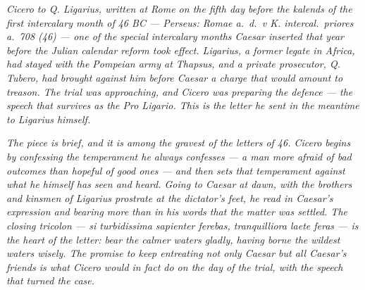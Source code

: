 
\textit{Cicero to Q. Ligarius, written at Rome on the fifth day
before the kalends of the first intercalary month of 46 BC ---
Perseus: \textit{Romae a.~d.~v K. intercal.~priores a.~708 (46)}
--- one of the special intercalary months Caesar inserted that
year before the Julian calendar reform took effect. Ligarius, a
former legate in Africa, had stayed with the Pompeian army at
Thapsus, and a private prosecutor, Q. Tubero, had brought against
him before Caesar a charge that would amount to treason. The
trial was approaching, and Cicero was preparing the defence ---
the speech that survives as the \textit{Pro Ligario}. This is the
letter he sent in the meantime to Ligarius himself.}

\textit{The piece is brief, and it is among the gravest of the
letters of 46. Cicero begins by confessing the temperament he
always confesses --- a man more afraid of bad outcomes than
hopeful of good ones --- and then sets that temperament against
what he himself has seen and heard. Going to Caesar at dawn, with
the brothers and kinsmen of Ligarius prostrate at the dictator's
feet, he read in Caesar's expression and bearing more than in his
words that the matter was settled. The closing tricolon ---
\textit{si turbidissima sapienter ferebas, tranquilliora laete
feras} --- is the heart of the letter: bear the calmer waters
gladly, having borne the wildest waters wisely. The promise to
keep entreating not only Caesar but all Caesar's friends is what
Cicero would in fact do on the day of the trial, with the speech
that turned the case.}
